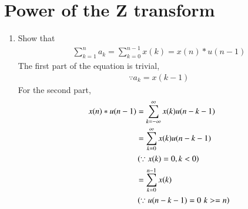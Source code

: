 \documentclass[journal,12pt,twocolumn]{IEEEtran}
\renewcommand\thesection{\arabic{section}}
\begin{document}
\section{Power of the Z transform}
\begin{enumerate}[label=\thesection.\arabic*,ref=\thesection.\theenumi]
\item Show that 
\begin{align}
	\sum_{k=1}^{n}a_k = 
	\sum_{k=0}^{n-1}x(k) = x(n)*u(n-1)
\end{align}
\solution The first part of the equation is trivial, 
   \begin{align}
     \because a_k = x(k-1)
   \end{align}
For the second part, 
 \begin{align}
	 x(n)*u(n-1) &= \sum_{k = -\infty}^{\infty}x(k)u(n-k-1) \\
	             &= \sum_{k = 0}^{\infty}x(k)u(n-k-1) \\ 
		     & \left(\because x(k) = 0, k < 0\right) \nonumber \\
		     &= \sum_{k=0}^{n-1}x(k) \\
		     &\left(\because u(n-k-1) = 0\, \, k  >=n\right) \nonumber
 \end{align}


\end{enumerate}
\end{document}
